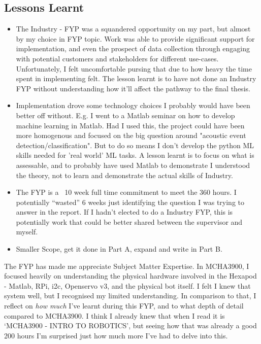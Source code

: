 \documentclass{UoNMCHA}
\newcommand{\inlineQuote}[1]{``#1''}
\numberwithin{equation}{section}
\begin{document}
\subsection{Lessons Learnt}
\begin{itemize}
    \item The Industry - FYP was a squandered opportunity on my part, but almost by my choice in FYP topic. Work was able to provide significant support for implementation, and even the prospect of data collection through engaging with potential customers and stakeholders for different use-cases. Unfortunately, I felt uncomfortable pursing that due to how heavy the time spent in implementing felt.  The lesson learnt is to have not done an Industry FYP without understanding how it'll affect the pathway to the final thesis. 
    \item Implementation drove some technology choices I probably would have been better off without. E.g. I went to a Matlab seminar on how to develop machine learning in Matlab. Had I used this, the project could have been more homogenous and focused on the big question around "acoustic event detection/classification". But to do so means I don't develop the python ML skills needed for 'real world' ML tasks. A lesson learnt is to focus on what is assessable, and to probably have used Matlab to demonstrate I understood the theory, not to learn and demonstrate the actual skills of Industry.
    \item The FYP is a ~10 week full time commitment to meet the 360 hours. I potentially \inlineQuote{wasted} 6 weeks just identifying the question I was trying to answer in the report. If I hadn't elected to do a Industry FYP, this is potentially work that could be better shared between the supervisor and myself.
    \item Smaller Scope, get it done in Part A, expand and write in Part B.
\end{itemize}

The FYP has made me appreciate Subject Matter Expertise. In MCHA3900, I focused heavily on understanding the physical hardware involved in the Hexapod - Matlab, RPi, i2c, Openservo v3, and the physical bot itself. I felt I knew that system well, but I recognised my limited understanding. In comparison to that, I reflect on \textit{how much} I've learnt during this FYP, and to what depth of detail compared to MCHA3900. I think I already knew that when I read it is `MCHA3900 - INTRO TO ROBOTICS', but seeing how that was already a good 200 hours I'm surprised just how much more I've had to delve into this.
\end{document}
